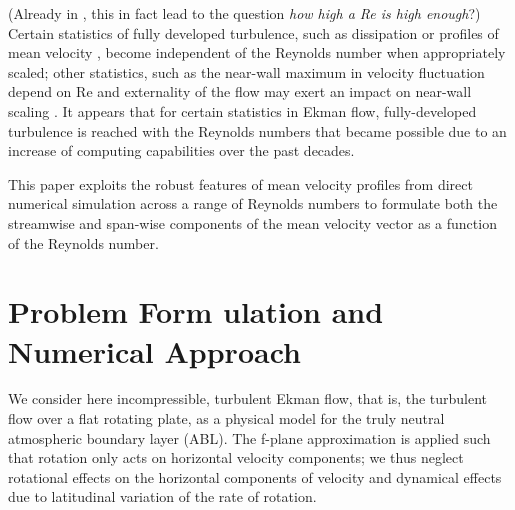 \documentclass[a4paper,11pt]{amsart}
\newcommand{\RE}{\mathrm{Re}}
\begin{document}
%
(Already in \citeyear{moin:ARF1998}, this in fact lead \citeauthor{moin:ARF1998} to the question \emph{how high a Re is high enough}?) 
%
Certain statistics of fully developed turbulence, such as dissipation \citep{dimotakis:ARF2005} or profiles of
mean velocity \citep{barenblatt:JFM1993}, become independent of the Reynolds number when appropriately scaled; 
other statistics, such as the near-wall maximum in velocity fluctuation depend on $\RE$ \citep{baars:JFM2020a} and externality
of the flow may exert an impact on near-wall scaling \citep{dasilva:ARF2014}. 
%
It appears that for certain statistics in Ekman flow, fully-developed turbulence is reached with the
Reynolds numbers that became possible due to an increase of computing capabilities over
the past decades.
%
\par
% 
This paper exploits the robust features of mean velocity profiles from direct numerical
simulation across a range of Reynolds numbers to formulate both the streamwise and span-wise components
of the mean velocity vector as a function of the Reynolds number.
%
\section{Problem Form
  ulation and Numerical Approach}
%
We consider here incompressible, turbulent Ekman flow, that is, the turbulent flow over a flat rotating plate, as
a physical model for the truly neutral atmospheric boundary layer (ABL).
%
The f-plane approximation is applied such that rotation only acts on horizontal velocity components;
we thus neglect rotational effects on the horizontal components of velocity and dynamical effects
due to latitudinal variation of the rate of rotation.
%
\end{document}
